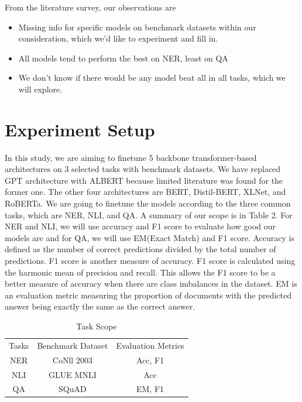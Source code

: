 \documentclass{article}
\begin{document}
From the literature survey, our observations are \\
\begin{itemize}
    \item Missing info for specific models on benchmark datasets within our consideration, which we'd like to experiment and fill in.
    \item All models tend to perform the best on NER, least on QA
    \item We don't know if there would be any model beat all in all tasks, which we will explore.
\end{itemize}

\section{Experiment Setup}
In this study, we are aiming to finetune 5 backbone transformer-based architectures on 3 selected tasks with benchmark datasets. We have replaced GPT architecture with ALBERT because limited literature was found for the former one. The other four architectures are BERT, Distil-BERT, XLNet, and RoBERTa. We are going to finetune the models according to the three common tasks, which are NER, NLI, and QA. A summary of our scope is in Table 2. For NER and NLI, we will use accuracy and F1 score to evaluate how good our models are and for QA, we will use EM(Exact Match) and F1 score. Accuracy is defined as the number of correct predictions divided by the total number of predictions. F1 score is another measure of accuracy. F1 score is calculated using the harmonic mean of precision and recall. This allows the F1 score to be a better measure of accuracy when there are class imbalances in the dataset. EM is an evaluation metric measuring the proportion of documents with the predicted answer being exactly the same as the correct answer.


\begin{table}[h]
    \centering
    \begin{tabular}{c|c|c}
       Tasks  & Benchmark Dataset & Evaluation Metrics \\
        NER & CoNll 2003 &Acc, F1 \\
        NLI & GLUE MNLI &Acc \\
        QA & SQuAD &EM, F1 \\
    \end{tabular}
    \caption{Task Scope}
    \label{tab:my_label}
\end{table}
\end{document}
